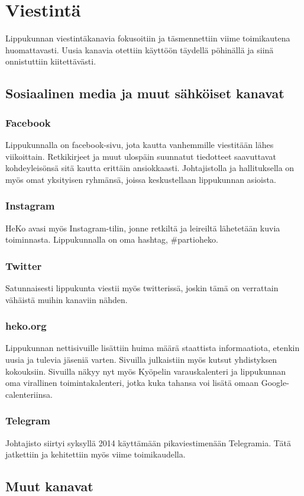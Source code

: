 \documentclass[a4paper, 12pt, finnish]{report} %
\begin{document}
\section{Viestintä}
Lippukunnan viestintäkanavia fokusoitiin ja täsmennettiin viime toimikautena huomattavasti. Uusia kanavia otettiin käyttöön täydellä pöhinällä ja siinä onnistuttiin kiitettävästi.
\subsection{Sosiaalinen media ja muut sähköiset kanavat}
\subsubsection{Facebook}
Lippukunnalla on facebook-sivu, jota kautta vanhemmille viestitään lähes viikoittain. Retkikirjeet ja muut ulospäin suunnatut tiedotteet saavuttavat kohdeyleisönsä sitä kautta erittäin ansiokkaasti. Johtajistolla ja hallituksella on myös omat yksityisen ryhmänsä, joissa keskustellaan lippukunnan asioista.
\subsubsection{Instagram}
HeKo avasi myös Instagram-tilin, jonne retkiltä ja leireiltä lähetetään kuvia toiminnasta. Lippukunnalla on oma hashtag, \#partioheko.
\subsubsection{Twitter}
Satunnaisesti lippukunta viestii myös twitterissä, joskin tämä on verrattain vähäistä muihin kanaviin nähden.
\subsubsection{heko.org}
Lippukunnan nettisivuille lisättiin huima määrä staattista informaatiota, etenkin uusia ja tulevia jäseniä varten. Sivuilla julkaistiin myös kutsut yhdistyksen kokouksiin. Sivuilla näkyy nyt myös Kyöpelin varauskalenteri ja lippukunnan oma virallinen toimintakalenteri, jotka kuka tahansa voi lisätä omaan Google-calenteriinsa.
\subsubsection{Telegram}
Johtajisto siirtyi syksyllä 2014 käyttämään pikaviestimenään Telegramia. Tätä jatkettiin ja kehitettiin myös viime toimikaudella.
\subsection{Muut kanavat}
\end{document}
